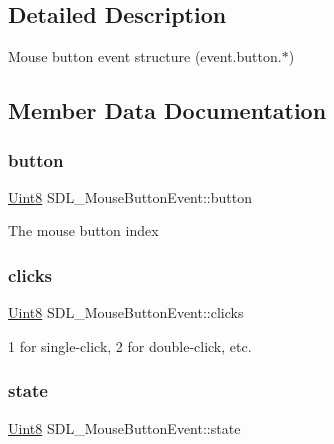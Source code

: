 \subsection{Detailed Description}
Mouse button event structure (event.\+button.$\ast$) 

\subsection{Member Data Documentation}
\mbox{\label{struct_s_d_l___mouse_button_event_a1a4680e19ae06d02d2093f0bcba1b24c}} 
\subsubsection{\texorpdfstring{button}{button}}
{\footnotesize\ttfamily \hyperlink{_s_d_l__stdinc_8h_a2944638813a090aa23e62f4da842c3e2}{Uint8} S\+D\+L\+\_\+\+Mouse\+Button\+Event\+::button}

The mouse button index \mbox{\label{struct_s_d_l___mouse_button_event_aa606bebcbc3ffc7e932016039c2a36a1}} 
\subsubsection{\texorpdfstring{clicks}{clicks}}
{\footnotesize\ttfamily \hyperlink{_s_d_l__stdinc_8h_a2944638813a090aa23e62f4da842c3e2}{Uint8} S\+D\+L\+\_\+\+Mouse\+Button\+Event\+::clicks}

1 for single-\/click, 2 for double-\/click, etc. \mbox{\label{struct_s_d_l___mouse_button_event_a8809cef85cfffad4f2059f2ba4fc6a3d}} 
\subsubsection{\texorpdfstring{state}{state}}
{\footnotesize\ttfamily \hyperlink{_s_d_l__stdinc_8h_a2944638813a090aa23e62f4da842c3e2}{Uint8} S\+D\+L\+\_\+\+Mouse\+Button\+Event\+::state}

